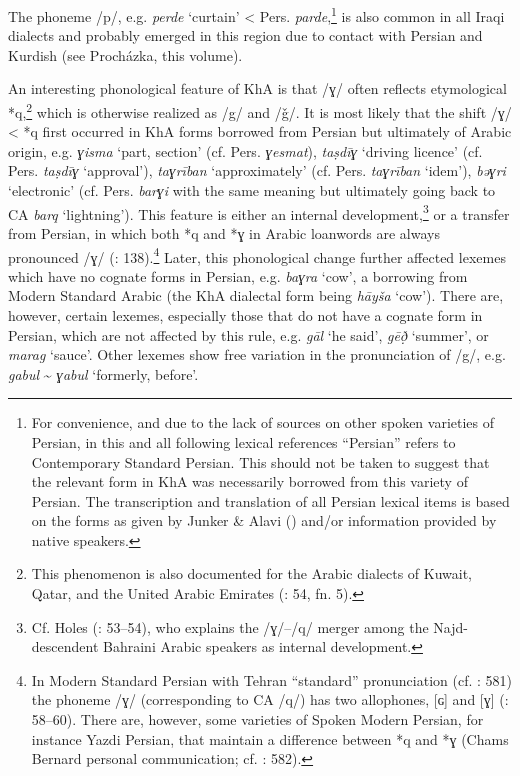 \documentclass[output=paper,nonflat]{langsci/langscibook}
\begin{document}
The phoneme /p/, e.g. \textit{perde} ‘curtain’ < Pers. \textit{parde},\footnote{For convenience, and due to the lack of sources on other spoken varieties of Persian, in this and all following lexical references ``Persian'' refers to Contemporary Standard Persian. This should not be taken to suggest that the relevant form in KhA was necessarily borrowed from this variety of Persian. The transcription and translation of all Persian lexical items is based on the forms as given by Junker \& Alavi (\citeyear{JunkerAlavi2002}) and/or information provided by native speakers.} is also common in all Iraqi dialects and probably emerged in this region due to contact with Persian and Kurdish (see Procházka, this volume). 

An interesting phonological feature of KhA is that /ɣ/ often reflects etymological *q,\footnote{This phenomenon is also documented for the Arabic dialects of Kuwait, Qatar, and the United Arabic Emirates (\citealt{Holes2016}: 54, fn. 5).} which is otherwise realized as /g/ and /ǧ/. It is most likely that the shift /ɣ/ < *q first occurred in KhA forms borrowed from Persian but ultimately of Arabic origin, e.g. \textit{ɣisma} ‘part, section’ (cf. Pers. \textit{ɣesmat}), \textit{taṣdīɣ} ‘driving licence’ (cf. Pers. \textit{taṣdīɣ} `approval'), \textit{taɣrīban} ‘approximately’ (cf. Pers. \textit{taɣrīban} `idem'), \textit{bəɣri} ‘electronic’ (cf. Pers. \textit{barɣi} with the same meaning but ultimately going back to CA \textit{barq} ‘lightning’). This feature is either an internal development,\footnote{Cf. Holes (\citeyear{Holes2016}: 53–54), who explains the /ɣ/–/q/ merger among the Najd-descendent Bahraini Arabic speakers as internal development.} or a transfer from Persian, in which both *q and *ɣ in Arabic loanwords are always pronounced /ɣ/ (\citealt{MatrasShabibi2007}: 138).\footnote{In Modern Standard Persian with Tehran ``standard'' pronunciation (cf. \citealt{Paul2018}: 581) the phoneme /ɣ/ (corresponding to CA /q/) has two allophones, [ɢ] and [ɣ] (\citealt{Majidi1986}: 58–60). There are, however, some varieties of Spoken Modern Persian, for instance Yazdi Persian, that maintain a difference between *q and *ɣ (Chams Bernard  personal communication; cf. \citealt{Paul2018}: 582).} Later, this phonological change further affected lexemes which have no cognate forms in Persian, e.g. \textit{baɣra} `cow', a borrowing from Modern Standard Arabic (the KhA dialectal form being \textit{hāyša} `cow'). There are, however, certain lexemes, especially those that do not have a cognate form in Persian, which are not affected by this rule, e.g. \textit{gāl} `he said', \textit{gēð̣} ‘summer’, or \textit{marag} ‘sauce’. Other lexemes show free variation in the pronunciation of /g/, e.g. \textit{gabul} \~{} \textit{ɣabul} `formerly, before'.
\end{document}
